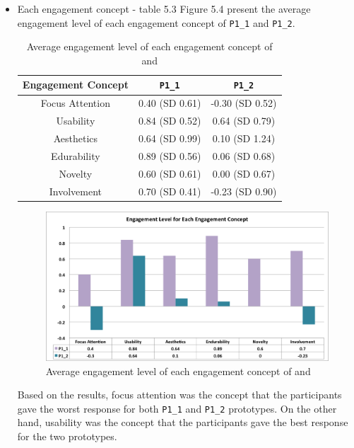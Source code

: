 \begin{itemize}
\item Each engagement concept - table 5.3 Figure 5.4 present the average engagement level of each engagement concept of \verb|P1_1| and \verb|P1_2|. 

\begin{table}[H]
\centering
\setlength{\tabcolsep}{5pt}
\caption{Average engagement level of each engagement concept of  and }
\begin{tabular}{|c|c|c|} \hline
Engagement Concept & \verb|P1_1| & \verb|P1_2|  \\
\hline
 \cellcolor{blue!25}Focus Attention&  \cellcolor{blue!25}0.40 (SD 0.61) &  \cellcolor{blue!25}-0.30 (SD 0.52)  \\
\hline 
\cellcolor{red!25}Usability& \cellcolor{red!25}0.84 (SD 0.52) & \cellcolor{red!25}0.64 (SD 0.79)  \\
\hline
Aesthetics & 0.64 (SD 0.99) & 0.10 (SD 1.24)  \\
\hline 
\cellcolor{green!25}Edurability & \cellcolor{green!25}0.89 (SD 0.56) & \cellcolor{green!25}0.06 (SD 0.68)  \\
\hline
Novelty & 0.60 (SD 0.61) & 0.00 (SD 0.67) \\
\hline 
Involvement & 0.70 (SD 0.41) & -0.23 (SD 0.90)  \\
\hline
\end{tabular}
\end{table}

\begin{figure}[H]
\centering
\includegraphics[width=1 \textwidth]{r12}
\caption{Average engagement level of each engagement concept of  and }
\end{figure}

Based on the results, focus attention was the concept that the participants gave the worst response for both \verb|P1_1| and \verb|P1_2| prototypes. On the other hand, usability was the concept that the participants gave the best response for the two prototypes. 


\end{itemize}

